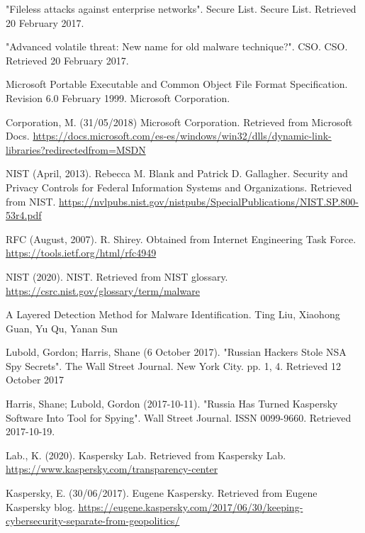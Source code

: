 \begin{thebibliography}{0}
    "Fileless attacks against enterprise networks". Secure List. Secure List. Retrieved 20 February 2017.

    "Advanced volatile threat: New name for old malware technique?". CSO. CSO. Retrieved 20 February 2017.

    Microsoft Portable Executable and Common Object File Format Specification. Revision 6.0 February 1999. Microsoft Corporation.

    Corporation, M. (31/05/2018) Microsoft Corporation. Retrieved from Microsoft Docs.
    \url{https://docs.microsoft.com/es-es/windows/win32/dlls/dynamic-link-libraries?redirectedfrom=MSDN}

    NIST (April, 2013). Rebecca M. Blank and Patrick D. Gallagher. Security and Privacy Controls for Federal Information Systems and Organizations. Retrieved from NIST.
    \url{https://nvlpubs.nist.gov/nistpubs/SpecialPublications/NIST.SP.800-53r4.pdf}

    RFC (August, 2007). R. Shirey. Obtained from Internet Engineering Task Force.
    \url{https://tools.ietf.org/html/rfc4949}

    NIST (2020). NIST. Retrieved from NIST glossary.
    \url{https://csrc.nist.gov/glossary/term/malware}

    A Layered Detection Method for Malware Identification. Ting Liu, Xiaohong Guan, Yu Qu, Yanan Sun

    Lubold, Gordon; Harris, Shane (6 October 2017). "Russian Hackers Stole NSA Spy Secrets". The Wall Street Journal. New York City. pp. 1, 4. Retrieved 12 October 2017

    Harris, Shane; Lubold, Gordon (2017-10-11). "Russia Has Turned Kaspersky Software Into Tool for Spying". Wall Street Journal. ISSN 0099-9660. Retrieved 2017-10-19.

    Lab., K. (2020). Kaspersky Lab. Retrieved from Kaspersky Lab.
    \url{https://www.kaspersky.com/transparency-center}

    Kaspersky, E. (30/06/2017). Eugene Kaspersky. Retrieved from Eugene Kaspersky blog.
    \url{https://eugene.kaspersky.com/2017/06/30/keeping-cybersecurity-separate-from-geopolitics/}


\end{thebibliography}
